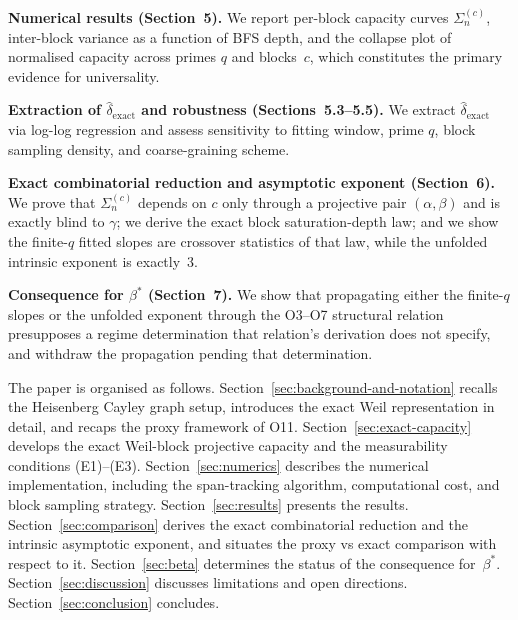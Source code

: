 \documentclass[11pt,a4paper]{article}
\begin{document}
    \textbf{Numerical results (Section~5).}
    We report per-block capacity curves $\Sigma_n^{(c)}$, inter-block variance as a function
    of BFS depth, and the collapse plot of normalised capacity across primes $q$ and blocks~$c$,
    which constitutes the primary evidence for universality.

    \textbf{Extraction of $\hat{\delta}_{\mathrm{exact}}$ and robustness (Sections~5.3--5.5).}
    We extract $\hat{\delta}_{\mathrm{exact}}$ via log-log regression and assess sensitivity
    to fitting window, prime $q$, block sampling density, and coarse-graining scheme.

    \textbf{Exact combinatorial reduction and asymptotic exponent (Section~6).}
    We prove that $\Sigma_n^{(c)}$ depends on $c$ only through a projective pair
    $(\alpha,\beta)$ and is exactly blind to $\gamma$; we derive the exact block
    saturation-depth law; and we show the finite-$q$ fitted slopes are crossover statistics
    of that law, while the unfolded intrinsic exponent is exactly~$3$.

    \textbf{Consequence for $\beta^*$ (Section~7).}
    We show that propagating either the finite-$q$ slopes or the unfolded exponent through
    the O3--O7 structural relation presupposes a regime determination that relation's
    derivation does not specify, and withdraw the propagation pending that determination.

    The paper is organised as follows.
    Section~\ref{sec:background-and-notation} recalls the Heisenberg Cayley graph setup, introduces the exact Weil
    representation in detail, and recaps the proxy framework of O11.
    Section~\ref{sec:exact-capacity} develops the exact Weil-block projective capacity and the measurability
    conditions (E1)--(E3).
    Section~\ref{sec:numerics} describes the numerical implementation, including the span-tracking algorithm,
    computational cost, and block sampling strategy.
    Section~\ref{sec:results} presents the results.
    Section~\ref{sec:comparison} derives the exact combinatorial reduction and the intrinsic
    asymptotic exponent, and situates the proxy vs exact comparison with respect to it.
    Section~\ref{sec:beta} determines the status of the consequence for~$\beta^*$.
    Section~\ref{sec:discussion} discusses limitations and open directions.
    Section~\ref{sec:conclusion} concludes.

    
    
    
    
    
    
    
    

    
      
\end{document}
